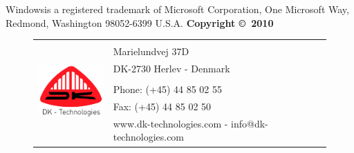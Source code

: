 Windows\registeredtm is a registered trademark of Microsoft Corporation, One Microsoft Way, Redmond, Washington 98052-6399 U.S.A.
\vfill	%
%
\noindent\textbf{Copyright \copyright\ 2010 \Firma}
\begin{figure}[b] \tiny\small
\begin{tabular}{ll}
\multirow{7}{*}{\includegraphics[width=80pt]{fig/dk_logo_centreret}}	& \Firma \\
& Marielundvej 37D				  \\ 
& DK-2730 Herlev - Denmark  \\
& 												  \\
& Phone:  (+45) 44 85 02 55 \\
& Fax:    (+45) 44 85 02 50 \\
& www.dk-technologies.com - info@dk-technologies.com\\
\end{tabular}
\end{figure}

\cleardoublepage
